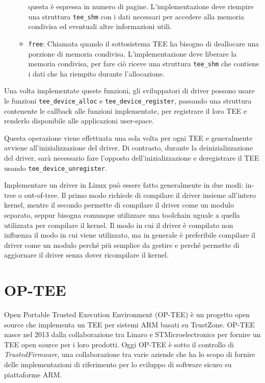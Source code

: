 \documentclass[12pt,italian]{report}
\begin{document}
\begin{itemize}
\begin{itemize}
            questa è espressa in numero di pagine.
            L'implementazione deve riempire una struttura \texttt{tee\_shm}
            con i dati necessari per accedere alla memoria condivisa ed
            eventuali altre informazioni utili.
        \item \texttt{free}: Chiamata quando il sottosistema TEE ha
            bisogno di deallocare una porzione di memoria condivisa.
            L'implementazione deve liberare la memoria condivisa, per
            fare ciò riceve una struttura \texttt{tee\_shm} che contiene
            i dati che ha riempito durante l'allocazione.
    \end{itemize}
\end{itemize}

Una volta implementate queste funzioni, gli sviluppatori di driver
possono usare le funzioni \texttt{tee\_device\_alloc} e
\texttt{tee\_device\_register}, passando una struttura contenente
le callback alle funzioni implementate, per registrare il loro TEE
e renderlo disponibile alle applicazioni user-space.

Questa operazione viene effettuata una sola volta per ogni TEE e
generalmente avviene all'inizializzazione del driver.
Di contrasto, durante la deinizializzazione del driver, sarà necessario
fare l'opposto dell'inizializzazione e deregistrare il TEE usando
\texttt{tee\_device\_unregister}.

\bigbreak \noindent

Implementare un driver in Linux può essere fatto generalmente in due modi:
in-tree o out-of-tree. Il primo modo richiede di compilare il driver insieme
all'intero kernel, mentre il secondo permette di compilare il driver come un
modulo separato, seppur bisogna comunque utilizzare una toolchain uguale a
quella utilizzata per compilare il kernel.
Il modo in cui il driver è compilato non influenza il modo in cui viene
utilizzato, ma in generale è preferibile compilare il driver come un modulo
perché più semplice da gestire e perché permette di aggiornare il driver
senza dover ricompilare il kernel.

\section{OP-TEE}
\label{sec:architettura-op-tee}
Open Portable Trusted Execution Environment (OP-TEE)\cite{optee}
è un progetto open source
che implementa un TEE per sistemi ARM basati su TrustZone.
OP-TEE nasce nel 2013 dalla collaborazione tra Linaro e STMicroelectronics
per fornire un TEE open source per i loro prodotti.
Oggi OP-TEE è sotto il controllo di \textit{TrustedFirmware}, una
collaborazione tra varie aziende che ha lo scopo di fornire delle
implementazioni di riferimento per lo sviluppo di software sicuro
su piattaforme ARM.
\end{document}

